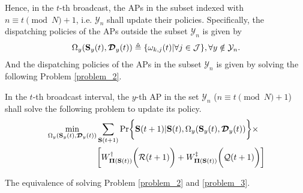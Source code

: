 Hence, in the $t$-th broadcast, the APs in the subset indexed with $n \equiv t \pmod{N} + 1$, i.e. $\mathcal{Y}_{n}$ shall update their policies.
Specifically, the dispatching policies of the APs outside the subset $\mathcal{Y}_{n}$ is given by
\begin{align}
    \Omega_{y}( \mathbf{S}_{y}(t),\boldsymbol{\mathcal{D}}_{y}(t) ) \triangleq \{ \omega_{k,j}(t) | \forall j\in\mathcal{J} \}, \forall y\notin\mathcal{Y}_{n}.
\end{align}
And the dispatching policies of the APs in the subset $\mathcal{Y}_{n}$ is given by solving the following Problem \ref{problem_2}.

\begin{problem}[]
    In the $t$-th broadcast interval, the $y$-th AP in the set $\mathcal{Y}_{n}$ ($n \equiv t \pmod{N} + 1$) shall solve the following problem to update its policy.
    {\small
    \begin{align}
        &\min_{ \Omega_{y}(\Stat_{y}(t), \Delay_{y}(t)) }
        \sum_{\Stat(t+1)} \Pr\Brace{
            \Stat(t+1) | \Stat(t), \Omega_{y}(\Stat_{y}(t), \Delay_{y}(t))
        } \times
        \nonumber\\
        &~~~~~~~~~~~~~~~~~~\Bracket{
            W^{\dagger}_{\Baseline(\Stat(t))} \Paren{\mathcal{R}(t+1)} + W^{\ddagger}_{\Baseline(\Stat(t))}\Paren{\mathcal{Q}(t+1)}
        }
    \end{align}
    }
    \label{problem_2}
\end{problem}

\begin{lemma}
    The equivalence of solving Problem \ref{problem_2} and \ref{problem_3}.
\end{lemma}

